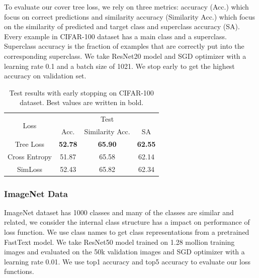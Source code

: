\documentclass[twoside]{article}
\theoremstyle{definition}
\begin{document}
To evaluate our cover tree loss, we rely on three metrics: accuracy (Acc.) which focus on correct predictions and similarity accuracy (Similarity Acc.) which focus on the similarity of predicted and target class and superclass accuracy (SA). Every example in CIFAR-100 dataset has a main class and a superclass. Superclass accuracy is the fraction of examples that are correctly put into the corresponding superclass.
We take ResNet20 model \cite{He2016DeepRL} and SGD optimizer with a learning rate 0.1 and a batch size of 1021. 
We stop early to get the highest accuracy on validation set.


\begin{table}[]
\caption{Test results with early stopping on CIFAR-100 dataset. Best values are written in bold.} \label{cifar100}
\begin{center}
\begin{tabular}{@{}cccc@{}}
\toprule
\multirow{2}{*}{Loss} & \multicolumn{3}{c}{Test}    \\ \cmidrule(l){2-4} 
                      & Acc. & Similarity Acc. & SA \\ \cmidrule(r){1-1}
Tree Loss       & \textbf{52.78}     &  \textbf{65.90}               &  \textbf{62.55}  \\
Cross Entropy         &  51.87    &   65.58              &  62.14  \\
SimLoss               &    52.43  &    65.82             & 62.34  \\\bottomrule
\end{tabular}
\end{center}
\end{table}


\subsubsection{ImageNet Data}
ImageNet dataset \cite{Russakovsky2015ImageNetLS} has 1000 classes and many of the classes are similar and related, we consider the internal class structure has a impact on performance of loss function.
We use class names to get class representations from a pretrained FastText model.
We take ResNet50 model \cite{He2016DeepRL} trained on 1.28 mollion training images and evaluated on the 50k validation images and SGD optimizer with a learning rate 0.01.
We use top1 accuracy and top5 accuracy to evaluate our loss functions.
\end{document}
